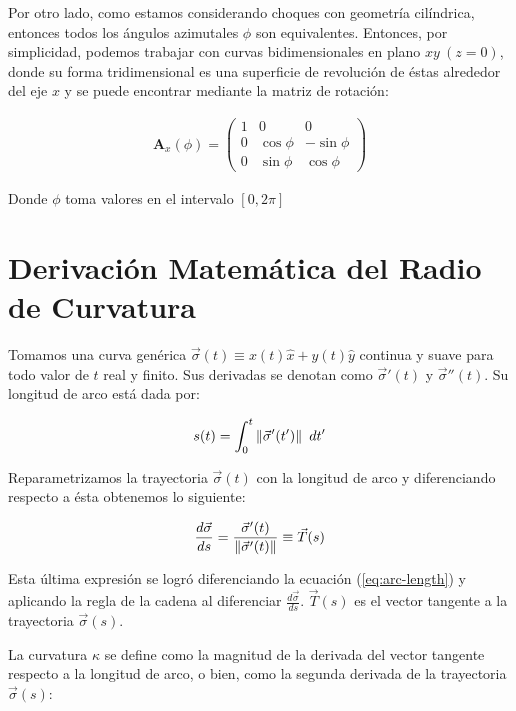 Por otro lado, como estamos considerando choques con geometría cilíndrica, entonces todos los ángulos azimutales $\phi$ son equivalentes. Entonces, por simplicidad, podemos trabajar con curvas bidimensionales en plano $xy~(z=0)$, donde su forma tridimensional es una superficie de revolución de éstas alrededor del eje $x$ y se puede encontrar mediante la matriz de rotación:

\begin{align}
  \mathbf{A}_x(\phi) = \left(
  \begin{array}{ccc}
    1 & 0        & 0         \\
    0 & \cos\phi & -\sin\phi \\
    0 & \sin\phi & \cos\phi
  \end{array}
  \right) \label{eq:x-matrix}
\end{align}

Donde $\phi$ toma valores en el intervalo $[0, 2\pi]$

\chapter{Derivación Matemática del Radio de Curvatura}
\label{app:math-curvature-radius}
\thispagestyle{empty}
Tomamos una curva genérica $\vec{\sigma}(t) \equiv x(t) \hat{x} + y(t) \hat{y}$ continua y suave para todo valor de $t$ real y finito. Sus derivadas se denotan como $\vec{\sigma}'(t)$ y $\vec{\sigma}''(t)$. Su longitud de arco está dada por:

\begin{align}
  s(t) = \int^t_0 \left\lVert\vec{\sigma}'(t')\right\rVert~dt' \label{eq:arc-length}
\end{align}

Reparametrizamos la trayectoria $\vec{\sigma}(t)$ con la longitud de arco y diferenciando respecto a ésta obtenemos lo siguiente:

\begin{align}
  \frac{d\vec{\sigma}}{ds} = \frac{\vec{\sigma}'(t)}{\left\lVert\vec{\sigma}'(t)\right\rVert} \equiv \vec{T}(s)
\end{align}

Esta última expresión se logró diferenciando la ecuación (\ref{eq:arc-length}) y aplicando la regla de la cadena al diferenciar $\frac{d\vec{\sigma}}{ds}$. $\vec{T}(s)$ es el vector tangente a la trayectoria $\vec{\sigma}(s)$.

La curvatura $\kappa$ se define como la magnitud de la derivada del vector tangente respecto a la longitud de arco, o bien, como la segunda derivada de la trayectoria $\vec{\sigma}(s)$:

